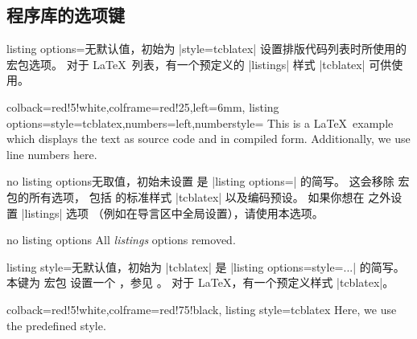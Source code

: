\clearpage
\subsection{ 程序库的选项键}\label{sec:speclistingkeys}

\begin{docTcbKey}{listing options}{=}{无默认值，初始为 |style=tcblatex|}
  设置排版代码列表时所使用的  \cite{hoffmann:listings} 宏包选项。
  对于 \LaTeX\ 列表，有一个预定义的 |listings| 样式 |tcblatex| 可供使用。
\begin{dispExample}
\begin{tcblisting}{colback=red!5!white,colframe=red!25,left=6mm,
listing options={style=tcblatex,numbers=left,numberstyle=\tiny\color{red!75!black}}}
This is a \LaTeX\ example which displays the text as source code
and in compiled form. Additionally, we use line numbers here.
\end{tcblisting}
\end{dispExample}
\end{docTcbKey}


\begin{docTcbKey}{no listing options}{}{无取值，初始未设置}
  是 |listing options={}| 的简写。
  这会移除  宏包的所有选项，
  包括  的标准样式 |tcblatex| 以及编码预设。
  如果你想在  之外设置 |listings| 选项
  （例如在导言区中全局设置），请使用本选项。
\begin{dispExample}
\begin{tcblisting}{no listing options}
All \textit{listings} options removed.
\end{tcblisting}
\end{dispExample}
\end{docTcbKey}


\begin{docTcbKey}{listing style}{=}{无默认值，初始为 |tcblatex|}
  是 |listing options={style=...}| 的简写。本键为  宏包
  设置一个 ，参见 \cite{hoffmann:listings}。
  对于 \LaTeX，有一个预定义样式 |tcblatex|。
\begin{dispExample}
\begin{tcblisting}{colback=red!5!white,colframe=red!75!black,
listing style=tcblatex}
Here, we use the predefined style.
\end{tcblisting}
\end{dispExample}
\end{docTcbKey}

